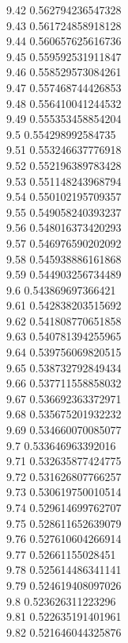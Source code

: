 {9.42	0.562794236547328\\
9.43	0.561724858918128\\
9.44	0.560657625616736\\
9.45	0.559592531911847\\
9.46	0.558529573084261\\
9.47	0.557468744426853\\
9.48	0.556410041244532\\
9.49	0.555353458854204\\
9.5	0.554298992584735\\
9.51	0.553246637776918\\
9.52	0.552196389783428\\
9.53	0.551148243968794\\
9.54	0.550102195709357\\
9.55	0.549058240393237\\
9.56	0.548016373420293\\
9.57	0.546976590202092\\
9.58	0.545938886161868\\
9.59	0.544903256734489\\
9.6	0.543869697366421\\
9.61	0.542838203515692\\
9.62	0.541808770651858\\
9.63	0.540781394255965\\
9.64	0.539756069820515\\
9.65	0.538732792849434\\
9.66	0.537711558858032\\
9.67	0.536692363372971\\
9.68	0.535675201932232\\
9.69	0.534660070085077\\
9.7	0.533646963392016\\
9.71	0.532635877424775\\
9.72	0.531626807766257\\
9.73	0.530619750010514\\
9.74	0.529614699762707\\
9.75	0.528611652639079\\
9.76	0.527610604266914\\
9.77	0.52661155028451\\
9.78	0.525614486341141\\
9.79	0.524619408097026\\
9.8	0.523626311223296\\
9.81	0.522635191401961\\
9.82	0.521646044325876\\
}
